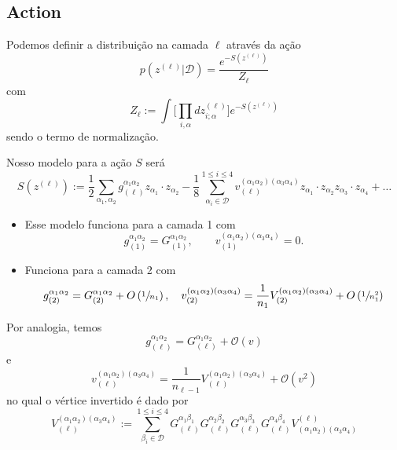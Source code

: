 \documentclass{beamer}
\newcommand{\Dcal}{\mathcal{D}}
\def\mi#1{{\alpha_{#1}}}
\def\mj#1{\beta_{#1}}
\def\eell{{(\ell)}}
\newcommand{\Gnormalinv}[3]{{G_{(#1)}^{\mi{#2}\mi{#3}}}}
\newcommand{\Verticeinv}[5]{V_{(#1)}^{(\mi#2\mi#3)(\mi#4\mi#5)}}
\begin{document}
\subsection{Action}

\begin{frame}
	Podemos definir a distribuição na camada $\ell$ através da ação
	\begin{equation*}\tag{4.78}
		p\left(z^\eell \Big| \Dcal\right) = \frac{e^{-S(z^\eell)}}{Z_\ell}
	\end{equation*}
	com 
	\begin{equation*}\tag{4.79}
		Z_\ell := \int\bigg[{\prod_{i,\alpha}} dz_{i;\alpha}^\eell\bigg]e^{-S(z^\eell)}
	\end{equation*}
	sendo o termo de normalização.
\end{frame}

\begin{frame}
	Nosso modelo para a ação $S$ será
	{\footnotesize
	\begin{equation*}\tag{4.80}
		S(z^\eell) := \frac{1}{2}\sum_{\mi1,\mi2}g^{\mi1\mi2}_{\eell} z_{\mi1}{\cdot}z_{\mi2} - \frac{1}{8}\sum_{\mi{i}\in\Dcal}^{1\le i \le 4} v^{(\mi1\mi2)(\mi3\mi4)}_{\eell} z_{\mi1}{\cdot}z_{\mi2} z_{\mi3}{\cdot}z_{\mi4}+\ldots
	\end{equation*}}
	\begin{itemize}
		\item Esse modelo funciona para a camada 1 com 
		$$g^{\mi1\mi2}_{(1)} = \Gnormalinv112, \qquad v_{(1)}^{(\mi1\mi2)(\mi3\mi4)} = 0.$$
		\item Funciona para a camada 2 com 
		{\small
		$$g^{\mi1\mi2}_{(2)} = \Gnormalinv212 + {O}\left(\sfrac{1}{n_1}\right), \quad v_{(2)}^{(\mi1\mi2)(\mi3\mi4)} = \frac{1}{n_1}\Verticeinv21234 + O\left(\sfrac{1}{n_1^2}\right) $$ }
	\end{itemize}
\end{frame}
\begin{frame}
	
Por analogia, temos
	\begin{equation*}\tag{4.81}
		g^{\mi1\mi2}_{\eell} = \Gnormalinv{\ell}12 + \mathcal{O}(v)
	\end{equation*}
	e 
	\begin{equation*}\tag{4.82}
		v^{(\mi1\mi2)(\mi3\mi4)}_{\eell} = \frac{1}{n_{\ell-1}}\Verticeinv{\ell}1234 + \mathcal{O}(v^2)
	\end{equation*}
no qual o vértice invertido é dado por
	\begin{equation*}\tag{4.83}
		\Verticeinv{\ell}1234 := \sum_{\mj{i}\in\Dcal}^{1\le i \le 4} G^{\mi1\mj1}_\eell G^{\mi2\mj2}_\eell G^{\mi3\mj3}_\eell G^{\mi4\mj4}_\eell V^\eell_{(\mi1\mi2)(\mi3\mi4)}
	\end{equation*}
\end{frame}
\end{document}
